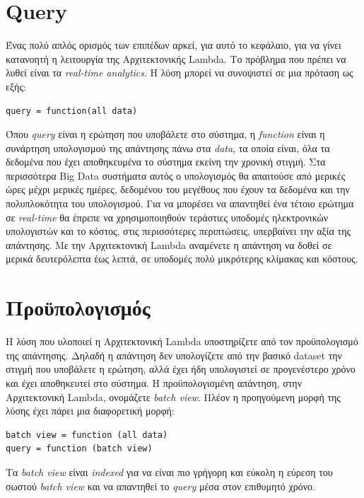 \section{Query}
Ένας πολύ απλός ορισμός των επιπέδων αρκεί, για αυτό το κεφάλαιο, για να γίνει κατανοητή η λειτουργία της Αρχιτεκτονικής Lambda. Το πρόβλημα που πρέπει να λυθεί είναι τα \textit{real-time analytics}. Η λύση μπορεί να συνοψιστεί σε μια πρόταση ως εξής:
\begin{verbatim}
query = function(all data)
\end{verbatim}

Όπου \textit{query} είναι η ερώτηση που υποβάλετε στο σύστημα, η \textit{function} είναι η συνάρτηση υπολογισμού της απάντησης πάνω στα \textit{data}, τα οποία είναι, όλα τα δεδομένα που έχει αποθηκευμένα το σύστημα εκείνη την χρονική στιγμή.
\newline
Στα περισσότερα Big Data συστήματα αυτός ο υπολογισμός θα απαιτούσε από μερικές ώρες μέχρι μερικές ημέρες, δεδομένου του μεγέθους που έχουν τα δεδομένα και την πολυπλοκότητα του υπολογισμού. Για να μπορέσει να απαντηθεί ένα τέτοιο ερώτημα σε \textit{real-time} θα έπρεπε να χρησιμοποιηθούν τεράστιες υποδομές ηλεκτρονικών υπολογιστών και το κόστος, στις περισσότερες περιπτώσεις, υπερβαίνει την αξία της απάντησης. Με την Αρχιτεκτονική Lambda αναμένετε η απάντηση να δοθεί σε μερικά δευτερόλεπτα έως λεπτά, σε υποδομές πολύ μικρότερης κλίμακας και κόστους. 

\section{Προϋπολογισμός}
Η λύση που υλοποιεί η Αρχιτεκτονική Lambda υποστηρίζετε από τον προϋπολογισμό της απάντησης. Δηλαδή η απάντηση δεν υπολογίζετε από την βασικό dataset την στιγμή που υποβάλετε η ερώτηση, αλλά έχει ήδη υπολογιστεί σε προγενέστερο χρόνο και έχει αποθηκευτεί στο σύστημα. Η προϋπολογισμένη απάντηση, στην Αρχιτεκτονική Lambda, ονομάζετε \textit{batch view}. Πλέον η προηγούμενη μορφή της λύσης έχει πάρει μια διαφορετική μορφή:
\begin{verbatim}
batch view = function (all data)
query = function (batch view)
\end{verbatim}
Τα \textit{batch view} είναι \textit{indexed} για να είναι πιο γρήγορη και εύκολη η εύρεση του σωστού \textit{batch view} και να απαντηθεί το \textit{query} μέσα στον επιθυμητό χρόνο.



